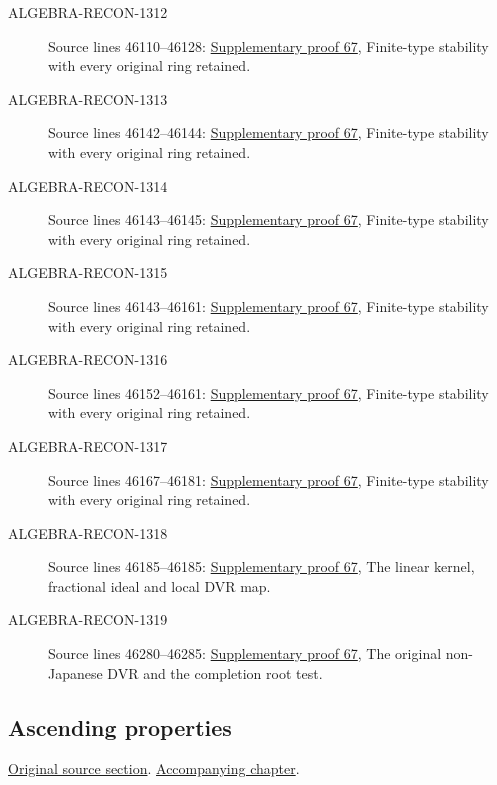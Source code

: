\begin{description}
\item[ALGEBRA-RECON-1312] Source lines 46110--46128: \hyperlink{algebra_nagata_notes_20260929}{Supplementary proof 67}, Finite-type stability with every original ring retained.
\item[ALGEBRA-RECON-1313] Source lines 46142--46144: \hyperlink{algebra_nagata_notes_20260929}{Supplementary proof 67}, Finite-type stability with every original ring retained.
\item[ALGEBRA-RECON-1314] Source lines 46143--46145: \hyperlink{algebra_nagata_notes_20260929}{Supplementary proof 67}, Finite-type stability with every original ring retained.
\item[ALGEBRA-RECON-1315] Source lines 46143--46161: \hyperlink{algebra_nagata_notes_20260929}{Supplementary proof 67}, Finite-type stability with every original ring retained.
\item[ALGEBRA-RECON-1316] Source lines 46152--46161: \hyperlink{algebra_nagata_notes_20260929}{Supplementary proof 67}, Finite-type stability with every original ring retained.
\item[ALGEBRA-RECON-1317] Source lines 46167--46181: \hyperlink{algebra_nagata_notes_20260929}{Supplementary proof 67}, Finite-type stability with every original ring retained.
\item[ALGEBRA-RECON-1318] Source lines 46185--46185: \hyperlink{algebra_nagata_notes_20260929}{Supplementary proof 67}, The linear kernel, fractional ideal and local DVR map.
\item[ALGEBRA-RECON-1319] Source lines 46280--46285: \hyperlink{algebra_nagata_notes_20260929}{Supplementary proof 67}, The original non-Japanese DVR and the completion root test.
\end{description}

\subsection{Ascending properties}
\hypertarget{algebra-source-section-ascending-properties}{}
\noindent\href{https://github.com/stacks/stacks-project/blob/a04446e57ec1fbc252a871afcec7752fb2807b14/algebra.tex\#L46293}{Original source section}. \href{algebra.pdf\#nameddest=section-ascending-properties}{Accompanying chapter}.

